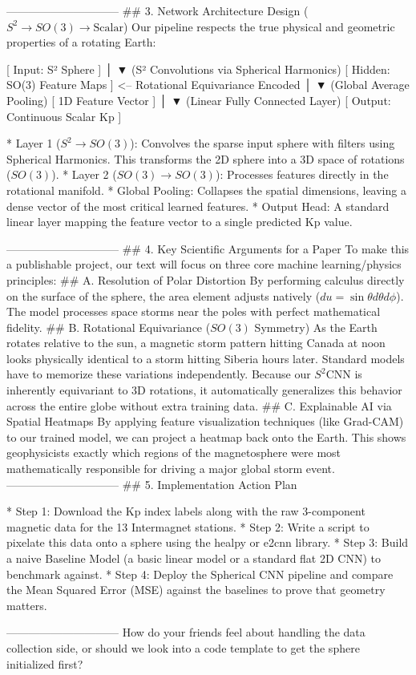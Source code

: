 ------------------------------
## 3. Network Architecture Design ($S^2 \to SO(3) \to \text{Scalar}$)
Our pipeline respects the true physical and geometric properties of a rotating Earth:

[ Input: S² Sphere ] 
        │
        ▼  (S² Convolutions via Spherical Harmonics)
[ Hidden: SO(3) Feature Maps ]  <-- Rotational Equivariance Encoded
        │
        ▼  (Global Average Pooling)
[ 1D Feature Vector ]
        │
        ▼  (Linear Fully Connected Layer)
[ Output: Continuous Scalar Kp ]


* Layer 1 ($S^2 \to SO(3)$): Convolves the sparse input sphere with filters using Spherical Harmonics. This transforms the 2D sphere into a 3D space of rotations ($SO(3)$).
* Layer 2 ($SO(3) \to SO(3)$): Processes features directly in the rotational manifold.
* Global Pooling: Collapses the spatial dimensions, leaving a dense vector of the most critical learned features.
* Output Head: A standard linear layer mapping the feature vector to a single predicted Kp value.

------------------------------
## 4. Key Scientific Arguments for a Paper
To make this a publishable project, our text will focus on three core machine learning/physics principles:
## A. Resolution of Polar Distortion
By performing calculus directly on the surface of the sphere, the area element adjusts natively ($du = \sin\theta d\theta d\phi$). The model processes space storms near the poles with perfect mathematical fidelity.
## B. Rotational Equivariance ($SO(3)$ Symmetry)
As the Earth rotates relative to the sun, a magnetic storm pattern hitting Canada at noon looks physically identical to a storm hitting Siberia hours later. Standard models have to memorize these variations independently. Because our $S^2\text{CNN}$ is inherently equivariant to 3D rotations, it automatically generalizes this behavior across the entire globe without extra training data.
## C. Explainable AI via Spatial Heatmaps
By applying feature visualization techniques (like Grad-CAM) to our trained model, we can project a heatmap back onto the Earth. This shows geophysicists exactly which regions of the magnetosphere were most mathematically responsible for driving a major global storm event.
------------------------------
## 5. Implementation Action Plan

* Step 1: Download the Kp index labels along with the raw 3-component magnetic data for the 13 Intermagnet stations.
* Step 2: Write a script to pixelate this data onto a sphere using the healpy or e2cnn library.
* Step 3: Build a naive Baseline Model (a basic linear model or a standard flat 2D CNN) to benchmark against.
* Step 4: Deploy the Spherical CNN pipeline and compare the Mean Squared Error (MSE) against the baselines to prove that geometry matters.

------------------------------
How do your friends feel about handling the data collection side, or should we look into a code template to get the sphere initialized first?

